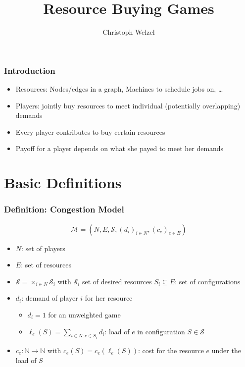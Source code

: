 \documentclass{beamer}
\title{Resource Buying Games}
\author[C. Welzel]{Christoph Welzel}
\newcommand{\tupel}[1]{\left(#1\right)}
\begin{document}

\maketitle

\begin{frame}
  \frametitle{Introduction}
    \begin{itemize}
      \item Resources: Nodes/edges in a graph, Machines to schedule jobs on,
        \dots
      \item Players: jointly buy resources to meet individual
        (potentially overlapping) demands
      \item<2-> Every player contributes to buy certain resources
      \item<3-> Payoff for a player depends on what she payed to meet her demands
    \end{itemize}
\end{frame}

\section{Basic Definitions}
\begin{frame}
  \frametitle{Definition: Congestion Model}
  \begin{equation*}
    \mathcal{M} = \tupel{N, E, \mathcal{S}, \left(d_{i}\right)_{i\in N},
    \left(c_{e}\right)_{e\in E}}
  \end{equation*}
  \vspace{-1cm}
  \begin{itemize}
    \item $N$: set of players
    \item<2-> $E$: set of resources
    \item<3-> $\mathcal{S} = \times_{i\in N}\mathcal{S}_{i}$ with $\mathcal{S}_{i}$
      set of desired resources $S_{i}\subseteq E$: set of configurations
    \item<4-> $d_{i}$: demand of player $i$ for her resource
      \begin{itemize}
        \item<4-> $d_{i} = 1$ for an unweighted game
        \item<4-> $\ell_{e}(S) = \sum_{i\in N:e\in S_{i}}d_{i}$: load of $e$
          in configuration $S\in\mathcal{S}$
      \end{itemize}
    \item<5-> $c_{e}:\mathbb{N}\rightarrow\mathbb{N}$ with
      $c_{e}(S) = c_{e}(\ell_{e}(S))$: cost for the resource $e$ under the load
      of $S$
  \end{itemize}
\end{frame}
\end{document}
